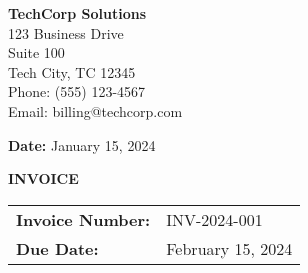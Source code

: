 \documentclass[a4paper,11pt]{article}
\begin{document}

\pagestyle{fancy}
\fancyhf{} %
\renewcommand{\headrulewidth}{0pt} %
\renewcommand{\footrulewidth}{0.4pt} %
\setlength{\footskip}{40pt} %

 


\begin{minipage}[t]{0.6\textwidth}
    \raggedright
    
    {\LARGE \textbf{TechCorp Solutions}} \\[0.3cm]
    
    123 Business Drive\\Suite 100\\Tech City, TC 12345 \\
    
    
    Phone: (555) 123-4567 \\
    
    
    Email: billing@techcorp.com \\
    
\end{minipage}

\begin{minipage}[t]{0.35\textwidth}
    \raggedleft
    \textbf{Date:} January 15, 2024
\end{minipage}

\vspace{1cm} 

\begin{center}
    {\LARGE \textbf{INVOICE}}
\end{center}

\vspace{0.5cm}

\begin{tabular}{ll}
    \textbf{Invoice Number:} & INV-2024-001 \\
    \textbf{Due Date:} & February 15, 2024 \\
\end{tabular}
\end{document}
